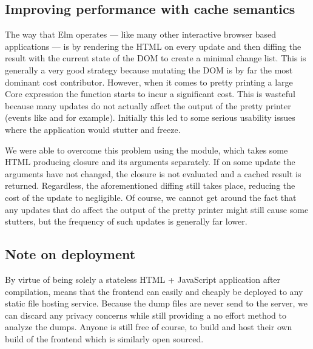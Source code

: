\subsection{Improving performance with cache semantics}

The way that Elm operates --- like many other interactive browser based applications --- is by rendering the HTML on every
update and then diffing the result with the current state of the DOM to create a minimal change list. This is generally a very
good strategy because mutating the DOM is by far the most dominant cost contributor. However, when it comes to pretty printing a
large Core expression the  function starts to incur a significant cost. This is wasteful because many updates do not
actually affect the output of the pretty printer (events like  and  for example).
Initially this led to some serious usability issues where the application would stutter and freeze.

We were able to overcome this problem using the  module, which takes some HTML producing closure and its arguments
separately. If on some update the arguments have not changed, the closure is not evaluated and a cached result is returned. Regardless,
the aforementioned diffing still takes place, reducing the cost of the update to negligible. Of course, we cannot get around the fact that
any updates that do affect the output of the pretty printer might still cause some stutters, but the frequency of such updates is 
generally far lower.

\subsection{Note on deployment}

By virtue of being solely a stateless HTML + JavaScript application after compilation, means that the frontend can
easily and cheaply be deployed to any static file hosting service. Because the dump files are never send to the server,
we can discard any privacy concerns while still providing a no effort method to analyze the dumps. Anyone is still free
of course, to build and host their own build of the frontend which is similarly open sourced.

